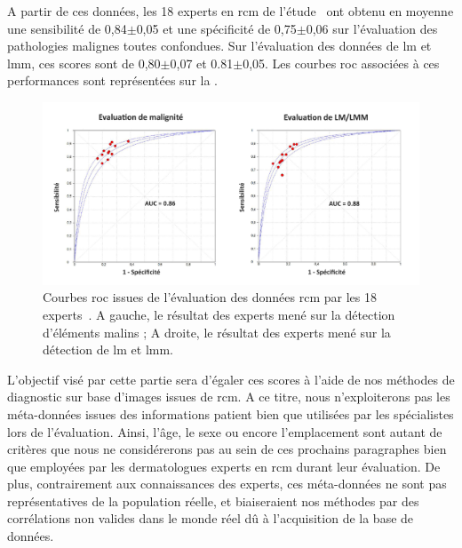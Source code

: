 A partir de ces données, les 18 experts en \gls{rcm} de l'étude~\cite{Cinotti2018} ont obtenu en moyenne une sensibilité de 0,84$\pm$0,05 et une spécificité de 0,75$\pm$0,06 sur l'évaluation des pathologies malignes toutes confondues. Sur l'évaluation des données de \gls{lm} et \gls{lmm}, ces scores sont de 0,80$\pm$0,07 et 0.81$\pm$0,05. Les courbes \gls{roc} associées à ces performances sont représentées sur la .\par

\begin{figure}[H]
    \begin{center}
        \includegraphics[width=\linewidth]{contents/iii_preamble_microscopy/resources/results_rcm_experts.pdf}
        \caption{Courbes \gls{roc} issues de l'évaluation des données \gls{rcm} par les 18 experts~\cite{Cinotti2018}. A gauche, le résultat des experts mené sur la détection d'éléments malins ; A droite, le résultat des experts mené sur la détection de \gls{lm} et \gls{lmm}.}
        \label{fig:results_rcm_experts}
    \end{center} 
\end{figure}\par

L'objectif visé par cette partie sera d'égaler ces scores à l'aide de nos méthodes de diagnostic sur base d'images issues de \gls{rcm}. A ce titre, nous n'exploiterons pas les méta-données issues des informations patient bien que utilisées par les spécialistes lors de l'évaluation. Ainsi, l'âge, le sexe ou encore l'emplacement sont autant de critères que nous ne considérerons pas au sein de ces prochains paragraphes bien que employées par les dermatologues experts en \gls{rcm} durant leur évaluation. De plus, contrairement aux connaissances des experts, ces méta-données ne sont pas représentatives de la population réelle, et biaiseraient nos méthodes par des corrélations non valides dans le monde réel dû à l'acquisition de la base de données.\par

